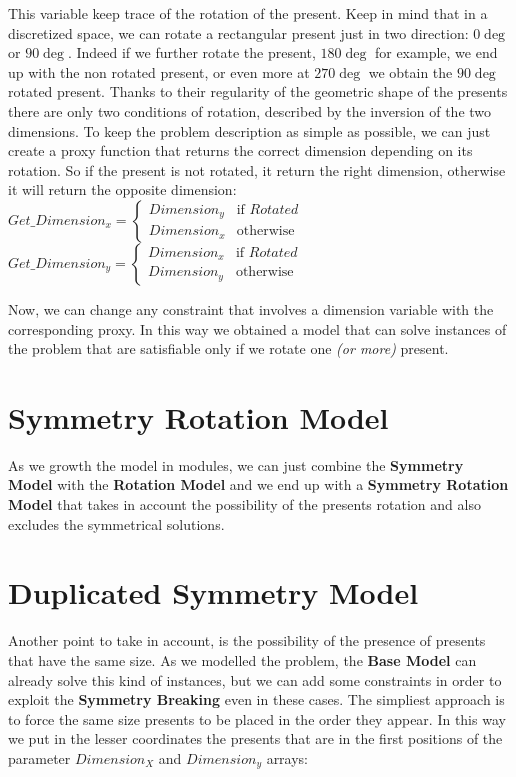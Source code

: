 This variable keep trace of the rotation of the present. Keep in mind that in a discretized space, we can rotate a rectangular present just in two direction: $0\deg$ or $90\deg$.
Indeed if we further rotate the present, $180\deg$ for example, we end up with the non rotated present, or even more at $270\deg$ we obtain the $90\deg$ rotated present.
Thanks to their regularity of the geometric shape of the presents there are only two conditions of rotation, described by the inversion of the two dimensions.
To keep the problem description as simple as possible, we can just create a proxy function that returns the correct dimension depending on its rotation.
So if the present is not rotated, it return the right dimension, otherwise it will return the opposite dimension:\\
$
Get\_Dimension_x = 
\begin{cases}
	Dimension_y & \text{if } Rotated \\
	Dimension_x & \text{otherwise}
\end{cases}
$
\\
$
Get\_Dimension_y = 
\begin{cases}
	Dimension_x & \text{if } Rotated \\
	Dimension_y & \text{otherwise}
\end{cases}
$

Now, we can change any constraint that involves a dimension variable with the corresponding proxy.
In this way we obtained a model that can solve instances of the problem that are satisfiable only if we rotate one \textit{(or more)} present.



\section{Symmetry Rotation Model}
As we growth the model in modules, we can just combine the \textbf{Symmetry Model} with the \textbf{Rotation Model} and we end up
with a \textbf{Symmetry Rotation Model} that takes in account the possibility of the presents rotation and also excludes the symmetrical
solutions.



\section{Duplicated Symmetry Model}
Another point to take in account, is the possibility of the presence of presents that have the same size. As we modelled the problem,
the \textbf{Base Model} can already solve this kind of instances, but we can add some constraints in order to exploit the \textbf{Symmetry Breaking}
even in these cases. The simpliest approach is to force the same size presents to be placed in the order they appear. In this way we put in the lesser
coordinates the presents that are in the first positions of the parameter $Dimension_X$ and $Dimension_y$ arrays:\\

